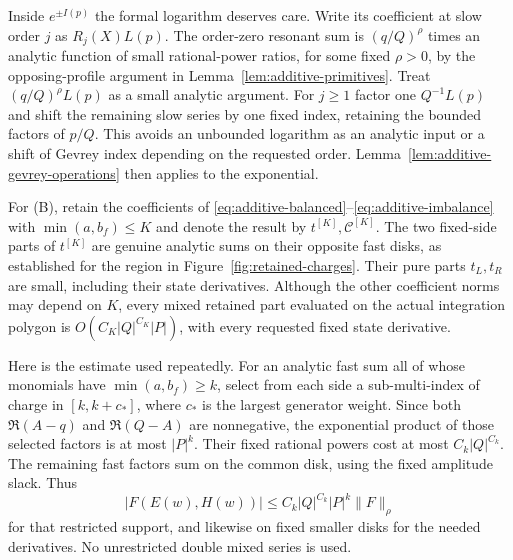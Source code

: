 Inside $e^{\pm I(p)}$ the formal logarithm deserves care.  Write its
coefficient at slow order $j$ as $R_j(X)L(p)$.  The order-zero
resonant sum is $(q/Q)^\rho$ times an analytic function of small
rational-power ratios, for some fixed $\rho>0$, by the opposing-profile
argument in Lemma~\ref{lem:additive-primitives}.  Treat
$(q/Q)^\rho L(p)$ as a small analytic argument.  For $j\ge1$ factor
one $Q^{-1}L(p)$ and shift the remaining slow series by one fixed
index, retaining the bounded factors of $p/Q$.  This avoids an
unbounded logarithm as an analytic input or a shift of Gevrey index
depending on the requested order.  Lemma~\ref{lem:additive-gevrey-operations}
then applies to the exponential.

For (B), retain the coefficients of
\eqref{eq:additive-balanced}--\eqref{eq:additive-imbalance} with
$\min(a,b_f)\le K$ and denote the result by
$t^{[K]},\mathcal C^{[K]}$.  The two fixed-side parts of $t^{[K]}$
are genuine analytic sums on their opposite fast disks, as established
for the region in Figure~\ref{fig:retained-charges}.
Their pure parts $t_L,t_R$ are small, including their state derivatives.  Although
the other coefficient norms may depend on $K$, every mixed retained
part evaluated on the actual integration polygon is
$O(C_K|Q|^{C_K}|P|)$, with every requested fixed state derivative.

Here is the estimate used repeatedly.  For an analytic fast sum all of
whose monomials have $\min(a,b_f)\ge k$, select from each side a
sub-multi-index of charge in $[k,k+c_*]$, where $c_*$ is the largest
generator weight.  Since both $\Re(A-q)$ and $\Re(Q-A)$ are
nonnegative, the exponential product of those selected factors is at
most $|P|^k$.  Their fixed rational powers cost at most
$C_k|Q|^{C_k}$.  The remaining fast factors sum on the common disk,
using the fixed amplitude slack.  Thus
\begin{equation}\label{eq:additive-charge-suppression}
 |F(E(w),H(w))|
       \le C_k|Q|^{C_k}|P|^k\|F\|_{\rho}
\end{equation}
for that restricted support, and likewise on fixed smaller disks for
the needed derivatives.  No unrestricted double mixed series is used.

